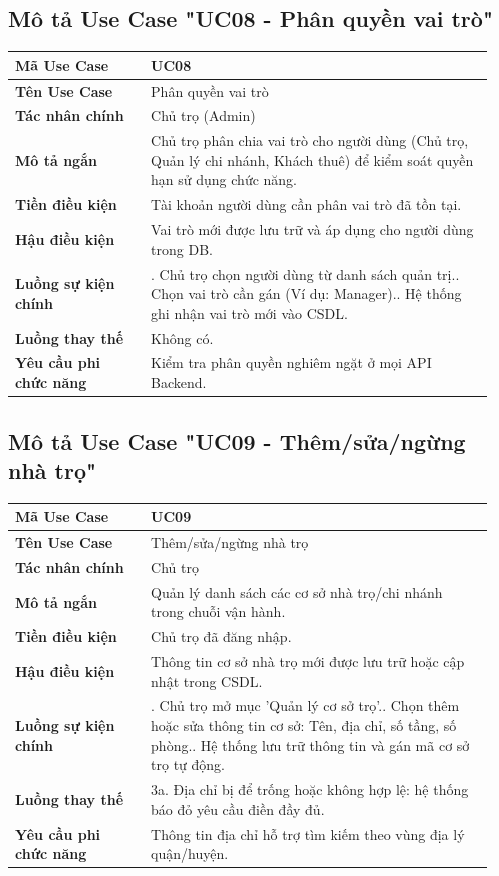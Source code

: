 \subsection{Mô tả Use Case "UC08 - Phân quyền vai trò"}

\begin{longtable}[]{@{}>{\RaggedRight\arraybackslash}p{0.27\linewidth}>{\RaggedRight\arraybackslash}p{0.68\linewidth}@{}}
\toprule
\textbf{Mã Use Case} & UC08\tabularnewline
\midrule
\endhead
\textbf{Tên Use Case} & Phân quyền vai trò\tabularnewline
\textbf{Tác nhân chính} & Chủ trọ (Admin)\tabularnewline
\textbf{Mô tả ngắn} & Chủ trọ phân chia vai trò cho người dùng (Chủ trọ,
Quản lý chi nhánh, Khách thuê) để kiểm soát quyền hạn sử dụng chức
năng.\tabularnewline
\textbf{Tiền điều kiện} & Tài khoản người dùng cần phân vai trò đã tồn
tại.\tabularnewline
\textbf{Hậu điều kiện} & Vai trò mới được lưu trữ và áp dụng cho người
dùng trong DB.\tabularnewline
\textbf{Luồng sự kiện chính} & 1. Chủ trọ chọn người
dùng từ danh sách quản trị.\newline 2. Chọn vai trò cần gán (Ví dụ:
Manager).\newline 3. Hệ thống ghi nhận vai trò mới vào
CSDL.\tabularnewline
\textbf{Luồng thay thế} & Không có.\tabularnewline
\textbf{Yêu cầu phi chức năng} & Kiểm tra phân quyền nghiêm ngặt ở mọi
API Backend.\tabularnewline
\bottomrule
\end{longtable}

\subsection{Mô tả Use Case "UC09 - Thêm/sửa/ngừng nhà trọ"}

\begin{longtable}[]{@{}>{\RaggedRight\arraybackslash}p{0.27\linewidth}>{\RaggedRight\arraybackslash}p{0.68\linewidth}@{}}
\toprule
\textbf{Mã Use Case} & UC09\tabularnewline
\midrule
\endhead
\textbf{Tên Use Case} & Thêm/sửa/ngừng nhà trọ\tabularnewline
\textbf{Tác nhân chính} & Chủ trọ\tabularnewline
\textbf{Mô tả ngắn} & Quản lý danh sách các cơ sở nhà trọ/chi nhánh
trong chuỗi vận hành.\tabularnewline
\textbf{Tiền điều kiện} & Chủ trọ đã đăng nhập.\tabularnewline
\textbf{Hậu điều kiện} & Thông tin cơ sở nhà trọ mới được lưu trữ hoặc
cập nhật trong CSDL.\tabularnewline
\textbf{Luồng sự kiện chính} & 1. Chủ trọ mở mục
'Quản lý cơ sở trọ'.\newline 2. Chọn thêm hoặc sửa thông tin cơ sở:
Tên, địa chỉ, số tầng, số phòng.\newline 3. Hệ thống lưu trữ thông
tin và gán mã cơ sở trọ tự động.\tabularnewline
\textbf{Luồng thay thế} & 3a. Địa chỉ bị để trống hoặc không hợp lệ: hệ
thống báo đỏ yêu cầu điền đầy đủ.\tabularnewline
\textbf{Yêu cầu phi chức năng} & Thông tin địa chỉ hỗ trợ tìm kiếm theo
vùng địa lý quận/huyện.\tabularnewline
\bottomrule
\end{longtable}

